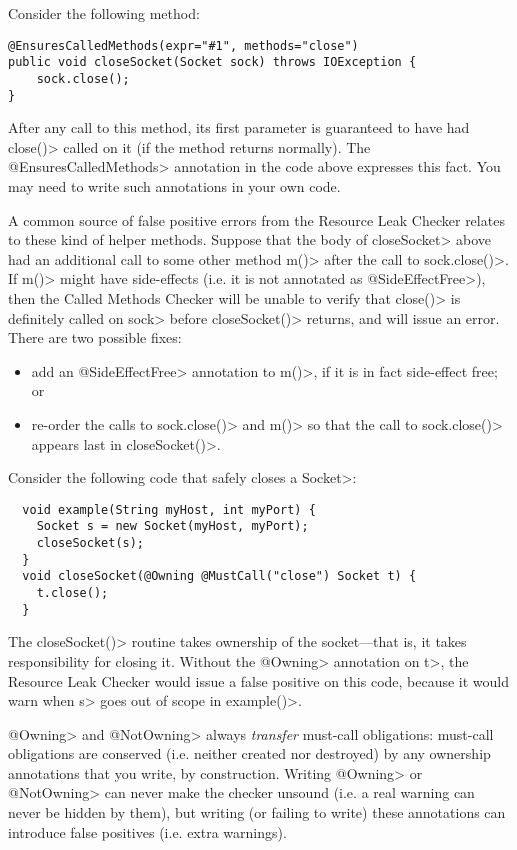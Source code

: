
Consider the following method:
\begin{verbatim}
@EnsuresCalledMethods(expr="#1", methods="close")
public void closeSocket(Socket sock) throws IOException {
    sock.close();
}
\end{verbatim}

After any call to this method, its first parameter is guaranteed to have had \<close()> called on it
(if the method returns normally). The \<@EnsuresCalledMethods> annotation in the code above expresses
this fact. You may need to write such annotations in your own code.

A common source of false positive errors from the Resource Leak Checker relates to these kind of helper
methods. Suppose that the body of \<closeSocket> above had an additional call to some other method
\<m()> after the call to \<sock.close()>. If \<m()> might have side-effects (i.e. it is not annotated
as \<@SideEffectFree>), then the Called Methods Checker will be unable to verify that \<close()> is definitely
called on \<sock> before \<closeSocket()> returns, and will issue an error. There are two possible fixes:
\begin{itemize}
\item add an \<@SideEffectFree> annotation to \<m()>, if it is in fact side-effect free; or
\item re-order the calls to \<sock.close()> and \<m()> so that the call to \<sock.close()> appears
last in \<closeSocket()>.
\end{itemize}


Consider the following code that safely closes a \<Socket>:

\begin{verbatim}
  void example(String myHost, int myPort) {
    Socket s = new Socket(myHost, myPort);
    closeSocket(s);
  }
  void closeSocket(@Owning @MustCall("close") Socket t) {
    t.close();
  }
\end{verbatim}

The \<closeSocket()> routine takes ownership of the socket---that is,
it takes responsibility for closing it. Without the \<@Owning>
annotation on \<t>, the Resource Leak Checker would issue a false positive on this
code, because it would warn when \<s>
goes out of scope in \<example()>.

\<@Owning> and \<@NotOwning> always \emph{transfer} must-call obligations: must-call
obligations are conserved (i.e. neither created nor destroyed) by any ownership annotations
that you write, by construction. Writing \<@Owning> or \<@NotOwning> can never make the checker
unsound (i.e. a real warning can never be hidden by them),
but writing (or failing to write) these annotations can introduce false positives (i.e. extra warnings).

